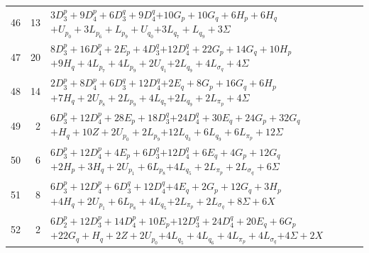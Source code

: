 \documentclass[11pt,a4paper]{article}
\theoremstyle{remark}
\begin{document}
\begin{longtable}{rrp{12.7cm}}
46&13&\( 3D_3^p + 9D_4^p + 6D_3^q + 9D_4^q \)\newline\( + 10G_p + 10G_q + 6H_p + 6H_q \)\newline\( + U_{p_{0}} + 3L_{p_{6}} + L_{p_{9}} + U_{q_{0}} \)\newline\( + 3L_{q_{7}} + L_{q_{9}} + 3\Sigma \)\\[3pt]
47&20&\( 8D_3^p + 16D_4^p + 2E_p + 4D_3^q \)\newline\( + 12D_4^q + 22G_p + 14G_q + 10H_p \)\newline\( + 9H_q + 4L_{p_{7}} + 4L_{p_{9}} + 2U_{q_{1}} \)\newline\( + 2L_{q_{9}} + 4L_{\sigma_q} + 4\Sigma \)\\[3pt]
48&14&\( 2D_3^p + 8D_4^p + 6D_3^q + 12D_4^q \)\newline\( + 2E_q + 8G_p + 16G_q + 6H_p \)\newline\( + 7H_q + 2U_{p_{8}} + 2L_{p_{9}} + 4L_{q_{7}} \)\newline\( + 2L_{q_{9}} + 2L_{\pi_p} + 4\Sigma \)\\[3pt]
49&2&\( 6D_3^p + 12D_4^p + 28E_p + 18D_3^q \)\newline\( + 24D_4^q + 30E_q + 24G_p + 32G_q \)\newline\( + H_q + 10Z + 2U_{p_{0}} + 2L_{p_{9}} \)\newline\( + 12L_{q_{3}} + 6L_{q_{9}} + 6L_{\pi_p} + 12\Sigma \)\\[3pt]
50&6&\( 6D_3^p + 12D_4^p + 4E_p + 6D_3^q \)\newline\( + 12D_4^q + 6E_q + 4G_p + 12G_q \)\newline\( + 2H_p + 3H_q + 2U_{p_{1}} + 6L_{p_{8}} \)\newline\( + 4L_{q_{5}} + 2L_{\pi_p} + 2L_{\sigma_q} + 6\Sigma \)\\[3pt]
51&8&\( 6D_3^p + 12D_4^p + 6D_3^q + 12D_4^q \)\newline\( + 4E_q + 2G_p + 12G_q + 3H_p \)\newline\( + 4H_q + 2U_{p_{1}} + 6L_{p_{8}} + 4L_{q_{5}} \)\newline\( + 2L_{\pi_p} + 2L_{\sigma_q} + 8\Sigma + 6X \)\\[3pt]
52&2&\( 6D_2^p + 12D_3^p + 14D_4^p + 10E_p \)\newline\( + 12D_3^q + 24D_4^q + 20E_q + 6G_p \)\newline\( + 22G_q + H_q + 2Z + 2U_{p_{0}} \)\newline\( + 4L_{q_{5}} + 4L_{q_{6}} + 4L_{\pi_p} + 4L_{\sigma_q} \)\newline\( + 4\Sigma + 2X \)\\[3pt]
\end{longtable}
\endgroup
\end{document}
